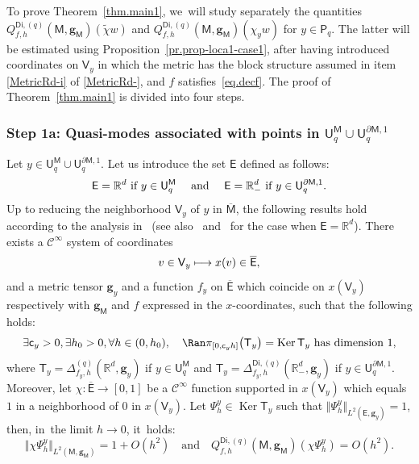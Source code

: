 \documentclass[JEP,XML,SOM,Unicode,NoEqCountersInSection,NoFloatCountersInSection,published]{cedram}
\newcommand\mto{\mathchoice{\longmapsto}{\mapsto}{\mapsto}{\mapsto}}
\newcommand{\quand}{\quad\text{and}\quad}
\newcommand{\mbf}[1]{\mathbf{#1}}
\let\pa\partial
\DeclareMathOperator\Ker{Ker}
\theoremstyle{plain}
\theoremstyle{definition}
\begin{document}
To prove Theorem~\ref{thm.main1}, we~will study separately the quantities $Q_{f,h}^{\mathsf{Di},(q)}(\mathsf M,\mbf g_{\mathsf M})(\tilde \chi w)$ and $Q_{f,h}^{\mathsf{Di},(q)}(\mathsf M,\mbf g_{\mathsf M})(\chi_y w)$ for $y\in \mathsf P_q$.
The latter will be estimated using
Proposition~\ref{pr.prop-loca1-case1}, after having introduced
coordinates on $\mathsf V_y$ in which the metric has the block structure
assumed in item \eqref{MetricRd-i} of \ref{MetricRd-}, and $f$ satisfies~\eqref{eq.decf}. The proof of Theorem~\ref{thm.main1} is divided into four steps.


\subsubsection*{Step 1a: Quasi-modes associated with points in $ \mathsf
U_q^{\mathsf M}\cup \mathsf U^{\pa \mathsf M,1}_q$} Let $y\in
\mathsf U_q^{\mathsf M}\cup \mathsf U^{\pa \mathsf M,1}_q$. Let us
introduce the set $\mathsf E$ defined as follows:\vspace*{-3pt}
\[
\text{$\mathsf E=\mathbb R^d$ if $ y\in \mathsf U_q^{\mathsf
M} \quad$ and $\quad\mathsf E=\mathbb R^d_-$ if $y\in \mathsf U^{\pa \mathsf
M,1}_q$.}
\]
Up to reducing the neighborhood $\mathsf V_y$ of $y$ in $\overline{\mathsf M}$, the following results hold according to the analysis in~\cite[Chap.\,3]{helffer-nier-06} (see also~\cite{helffer-sjostrand-85} and~\cite{HKN} for the case when $\mathsf E=\mathbb R^d$). There exists a $\mathcal C^\infty$ system of coordinates\vspace*{-3pt}
\[
v\in \mathsf V_y\mto x(v) \in \overline{\mathsf E},
\]
and a metric tensor $\mbf g_y$ and a function $f_y$ on $
\overline{\mathsf E}$ which coincide on $x(\mathsf V_y)$ respectively with $\mbf
g_{\mathsf M}$ and $f$ expressed in the $x$-coordinates,
such that the following holds:\vspace*{-3pt}
\begin{equation}\label{eq.span=12}
\exists \mathsf c_y>0, \exists h_0 >0, \forall h \in (0,h_0),\quad \Ran \pi_{[0,\mathsf c_yh]}\bigl(\mathsf T_y \bigr)=\Ker \mathsf T_y \text{ has dimension } 1,
\end{equation}
where $\mathsf T_y=\Delta_{f_y,h}^{(q)}(\mathbb R^d,\mbf g_y)$ if
$y\in \mathsf U_q^{\mathsf
M}$ and $\mathsf T_y=\Delta_{f_y,h}^{\mathsf{Di},(q)}(\mathbb R^d_-,\mbf g_y)$ if $y\in \mathsf U^{\pa \mathsf
M,1}_q$.
Moreover, let $\chi: \overline{\mathsf E} \to [0,1]$ be a $\mathcal C^\infty$ function supported in $x(\mathsf V_y)$ which equals~$1$ in a neighborhood of $0$ in $x(\mathsf V_y)$.
Let $\Psi_h^y\in \Ker\mathsf T_y$ such that $ \Vert \Psi_h^y\Vert_{L^2(\mathsf E,\mbf g_y)}=1$, then, in~the limit $h\to 0$, it~holds:
\begin{equation}\label{eq.omega-z2}
\Vert \chi \Psi_h^y \Vert_{L^2(\mathsf M,\mbf g_{\mathsf M})} =1+O (h^{2}) \quand Q_{f,h}^{\mathsf{Di},(q)}(\mathsf M,\mbf g_{\mathsf M})(\chi \Psi_h^y)=O(h^2).
\end{equation}
\end{document}
